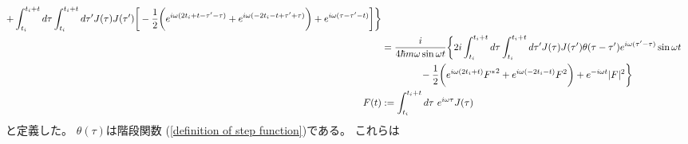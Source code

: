 \begin{subequations}
\begin{align}
    +
    \int_{t_i}^{t_i + t}
        d\tau
    \int_{t_i}^{t_i + t}
        d\tau'
    J(\tau) J(\tau')
    \bigg[
    -
    \dfrac{1}{2}
    \bigg(
        e^{ i \omega (2 t_i + t - \tau' - \tau) }
    +
        e^{ i \omega ( - 2 t_i - t + \tau' + \tau) }
    \bigg)
    +
        e^{ i \omega (\tau - \tau' - t) }
    \bigg]
    \bigg\}
\notag\\&
    =
    \dfrac{i}{4 \hbar m \omega \sin \omega t}
    \bigg\{
    2 i
    \int_{t_i}^{t_i + t}
        d\tau
    \int_{t_i}^{t_i + t}
        d\tau'
    J(\tau) J(\tau')
    \theta(\tau - \tau')
        e^{ i \omega (\tau' - \tau) }
    \sin \omega t
\notag\\&\qquad\qquad
    -
    \dfrac{1}{2}
    \bigg(
        e^{ i \omega (2 t_i + t) }
            { F^* }^2
    +
        e^{ i \omega ( - 2 t_i - t) }
            F^2
    \bigg)
    +
        e^{ - i \omega t }
            | F |^2
    \bigg\}
\\
    F(t)
    &:=
    \int_{t_i}^{t_i + t} d\tau\ 
        e^{i \omega \tau}
        J(\tau)
\end{align}
\end{subequations}
と定義した。
$\theta(\tau)$は階段関数
(\ref{definition of step function})である。
これらは
